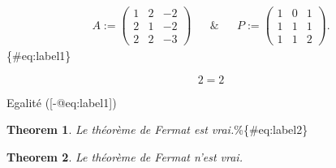 \[\begin{aligned}
\label{ezrpfire}
&A:=  \begin{pmatrix}1 & 2 & -2\\2 & 1 & -2\\2 & 2 & -3\end{pmatrix}&
& \& & 
&P:=  \begin{pmatrix}1 & 0 & 1\\1 & 1 & 1\\1 & 1 & 2\end{pmatrix}.&
\end{aligned}\]\{\#eq:label1\}

\[2=2\]

Egalité ({[}-@eq:label1{]})

\textbf{Theorem 1}. \emph{Le théorème de Fermat est
vrai.}\%\{\#eq:label2\}

\textbf{Theorem 2}. \emph{Le théorème de Fermat n'est vrai.}
